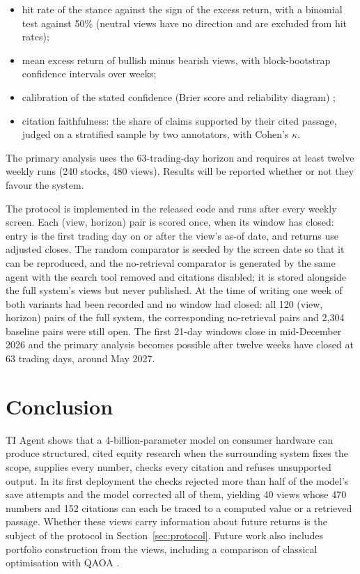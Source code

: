 \documentclass[preprint,11pt]{elsarticle}
\begin{document}
\begin{itemize}
  \item hit rate of the stance against the sign of the excess return, with a binomial test against 50\%
        (neutral views have no direction and are excluded from hit rates);
  \item mean excess return of bullish minus bearish views, with block-bootstrap confidence intervals over weeks;
  \item calibration of the stated confidence (Brier score and reliability diagram) \cite{guo2017calibration};
  \item citation faithfulness: the share of claims supported by their cited passage, judged on a stratified
        sample by two annotators, with Cohen's $\kappa$.
\end{itemize}

\noindent The primary analysis uses the 63-trading-day horizon and requires at least twelve weekly runs
(240 stocks, 480 views). Results will be reported whether or not they favour the system.

The protocol is implemented in the released code and runs after every weekly screen. Each (view, horizon)
pair is scored once, when its window has closed: entry is the first trading day on or after the view's
as-of date, and returns use adjusted closes. The random comparator is seeded by the screen date so that it
can be reproduced, and the no-retrieval comparator is generated by the same agent with the search tool
removed and citations disabled; it is stored alongside the full system's views but never published. At the
time of writing one week of both variants had been recorded and no window had closed: all 120 (view, horizon)
pairs of the full system, the corresponding no-retrieval pairs and 2{,}304 baseline pairs were still open.
The first 21-day windows close in mid-December 2026 and the primary analysis becomes possible after twelve
weeks have closed at 63 trading days, around May 2027.

\section{Conclusion}
\label{sec:conclusion}

TI Agent shows that a 4-billion-parameter model on consumer hardware can produce structured, cited equity
research when the surrounding system fixes the scope, supplies every number, checks every citation and
refuses unsupported output. In its first deployment the checks rejected more than half of the model's save
attempts and the model corrected all of them, yielding 40 views whose 470 numbers and 152 citations can each be
traced to a computed value or a retrieved passage. Whether these views carry information about future returns
is the subject of the protocol in Section~\ref{sec:protocol}. Future work also includes portfolio
construction from the views, including a comparison of classical optimisation with QAOA
\cite{farhi2014quantum, brandhofer2022benchmarking}.
\end{document}
